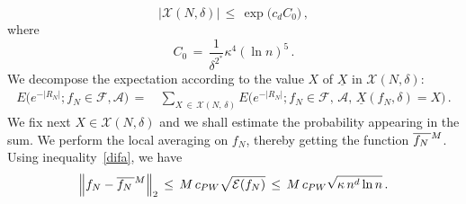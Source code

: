 \documentclass[AHL, Unicode, longabstracts, published]{cedram}
\newcommand{\XX}{{\underline{X}}}
\newcommand*\fmn{\overline{f_N\,}^{\lower2pt\hbox{$\scriptstyle M$}}}
\newcommand{\cA}{\mathcal{A}}
\newcommand{\cE}{\mathcal{E}}
\newcommand{\cF}{\mathcal{F}}
\newcommand{\cX}{\mathcal{X}}
\begin{document}
\begin{equation}\label{siq}
\big|
\cX(N,\delta)
\big|\,\leq\,
\exp\big(c_dC_0\big)
\,,
\end{equation}
where
\begin{equation}\label{saq}
C_0\,=\,
\frac{1} { \delta^{2^*}}
\kappa^4(\ln n)^{5}\,.
\end{equation}
We decompose the expectation according to the value $X$ of $\XX$ in $\cX(N,\delta)$:
\begin{align}\label{suma}
E\big(e^{-|R_N|}; f_N\in\cF,\cA)\,=\,&
\sum_{X\,\in\,\cX(N,\,\delta)} E\big(e^{-|R_N|}; f_N\in\cF,\,\cA,\,\XX(f_N,\delta)=X\big)\,.
\end{align}
We fix next ${X\in \cX(N,\delta)}$ and we shall estimate the probability appearing in the sum. We perform the local averaging on $f_N$, thereby getting the function $\fmn$. Using inequality~\eqref{difa}, we have
\begin{equation}\label{dba}
\left\|f_N-\fmn\right\|_2
\,\leq\,M\,c_{PW}
\sqrt{\cE(f_N)}
\,\leq\,M\,c_{PW}
\sqrt{\kappa \,n^d\ln n}
\,.
\end{equation}
\end{document}

